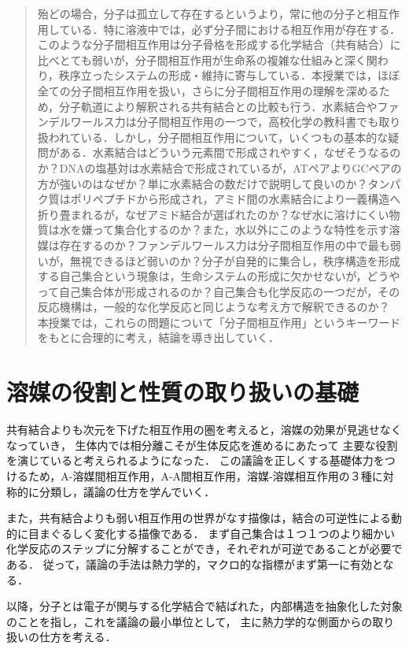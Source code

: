 \documentclass[uplatex, dvipdfmx]{jsreport}
\begin{document}
\begin{quotation}
    殆どの場合，分子は孤立して存在するというより，常に他の分子と相互作用している．特に溶液中では，必ず分子間における相互作用が存在する．このような分子間相互作用は分子骨格を形成する化学結合（共有結合）に比べとても弱いが，分子間相互作用が生命系の複雑な仕組みと深く関わり，秩序立ったシステムの形成・維持に寄与している．本授業では，ほぼ全ての分子間相互作用を扱い，さらに分子間相互作用の理解を深めるため，分子軌道により解釈される共有結合との比較も行う．水素結合やファンデルワールス力は分子間相互作用の一つで，高校化学の教科書でも取り扱われている．しかし，分子間相互作用について，いくつもの基本的な疑問がある．水素結合はどういう元素間で形成されやすく，なぜそうなるのか？DNAの塩基対は水素結合で形成されているが，ATペアよりGCペアの方が強いのはなぜか？単に水素結合の数だけで説明して良いのか？タンパク質はポリペプチドから形成され，アミド間の水素結合により一義構造へ折り畳まれるが，なぜアミド結合が選ばれたのか？なぜ水に溶けにくい物質は水を嫌って集合化するのか？また，水以外にこのような特性を示す溶媒は存在するのか？ファンデルワールス力は分子間相互作用の中で最も弱いが，無視できるほど弱いのか？分子が自発的に集合し，秩序構造を形成する自己集合という現象は，生命システムの形成に欠かせないが，どうやって自己集合体が形成されるのか？自己集合も化学反応の一つだが，その反応機構は，一般的な化学反応と同じような考え方で解釈できるのか？
    本授業では，これらの問題について「分子間相互作用」というキーワードをもとに合理的に考え，結論を導き出していく．
\end{quotation}

\chapter{溶媒の役割と性質の取り扱いの基礎}
共有結合よりも次元を下げた相互作用の圏を考えると，溶媒の効果が見逃せなくなっていき，
生体内では相分離こそが生体反応を進めるにあたって
主要な役割を演じていると考えられるようになった．
この議論を正しくする基礎体力をつけるため，A-溶媒間相互作用，A-A間相互作用，溶媒-溶媒相互作用の３種に対称的に分類し，議論の仕方を学んでいく．

また，共有結合よりも弱い相互作用の世界がなす描像は，結合の可逆性による動的に目まぐるしく変化する描像である．
まず自己集合は１つ１つのより細かい化学反応のステップに分解することができ，それぞれが可逆であることが必要である．
従って，議論の手法は熱力学的，マクロ的な指標がまず第一に有効となる．

以降，分子とは電子が関与する化学結合で結ばれた，内部構造を抽象化した対象のことを指し，これを議論の最小単位として，
主に熱力学的な側面からの取り扱いの仕方を考える．
\end{document}
